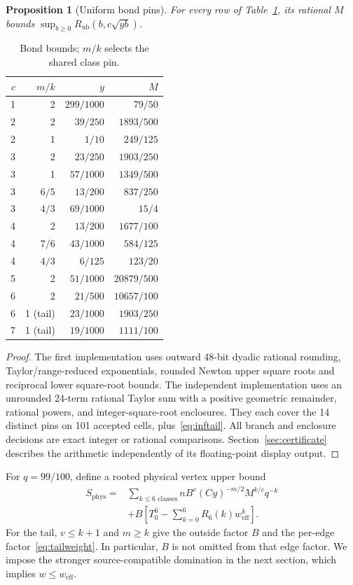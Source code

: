 \documentclass[11pt]{article}
\theoremstyle{plain}
\newtheorem{proposition}{Proposition}
\theoremstyle{remark}
\newcommand{\phys}{\mathrm{phys}}
\begin{document}
\begin{proposition}[Uniform bond pins]\label{prop:pins}
For every row of Table~\ref{tab:pins}, its rational $M$ bounds
$\sup_{b\ge0}R_{\mathrm{ub}}(b,c\sqrt{yb})$.
\end{proposition}
\begin{table}[htbp]
\centering\small
\begin{tabular}{rrrr}
$c$&$m/k$&$y$&$M$\\\hline
1&2&$299/1000$&$79/50$\\
2&2&$39/250$&$1893/500$\\
2&1&$1/10$&$249/125$\\
3&2&$23/250$&$1903/250$\\
3&1&$57/1000$&$1349/500$\\
3&$6/5$&$13/200$&$837/250$\\
3&$4/3$&$69/1000$&$15/4$\\
4&2&$13/200$&$1677/100$\\
4&$7/6$&$43/1000$&$584/125$\\
4&$4/3$&$6/125$&$123/20$\\
5&2&$51/1000$&$20879/500$\\
6&2&$21/500$&$10657/100$\\
6&1 (tail)&$23/1000$&$1903/250$\\
7&1 (tail)&$19/1000$&$1111/100$\\\hline
\end{tabular}
\caption{Bond bounds; $m/k$ selects the shared class pin.}\label{tab:pins}
\end{table}
\begin{proof}
The first implementation uses outward 48-bit dyadic rational rounding,
Taylor/range-reduced exponentials, rounded Newton upper square roots and
reciprocal lower square-root bounds. The independent implementation uses an
unrounded 24-term rational Taylor sum with a positive geometric remainder,
rational powers, and integer-square-root enclosures. They each cover the
14 distinct pins on 101 accepted cells, plus~\eqref{eq:inftail}.
All branch and enclosure decisions are exact integer or rational comparisons.
Section~\ref{sec:certificate} describes the arithmetic independently of its
floating-point display output.
\end{proof}

For $q=99/100$, define a rooted physical vertex upper bound
\begin{equation}\label{eq:physicalbudget}
\begin{split}
S_{\phys}={}&\sum_{k\le6\text{ classes}}
 n B^v (Cy)^{-m/2}M^{k/c}q^{-k}\\
&+B\left[T_0^6-\sum_{k=0}^6R_6(k)w_{\mathrm{eff}}^k\right].
\end{split}
\end{equation}
For the tail, $v\le k+1$ and $m\ge k$ give the outside factor $B$ and the
per-edge factor~\eqref{eq:tailweight}. In particular, $B$ is not omitted
from that edge factor. We impose the stronger source-compatible domination
in the next section, which implies $w\le w_{\mathrm{eff}}$.
\end{document}
